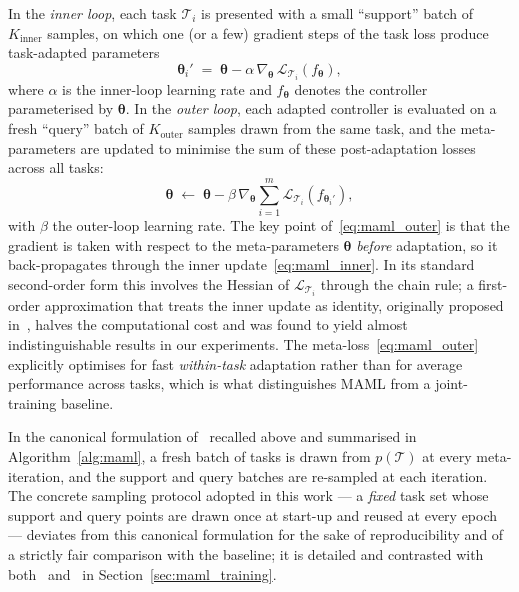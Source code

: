 \documentclass[11pt,a4paper]{article}
\theoremstyle{remark}
\numberwithin{equation}{section}
\begin{document}
In the \emph{inner loop}, each task $\mathcal{T}_i$ is presented with a small
``support'' batch of $K_{\mathrm{inner}}$ samples, on which one (or a few)
gradient steps of the task loss produce task-adapted parameters
\begin{equation}
\boldsymbol{\theta}_i' \;=\; \boldsymbol{\theta}
- \alpha \, \nabla_{\boldsymbol{\theta}}\,
  \mathcal{L}_{\mathcal{T}_i}\!\left(f_{\boldsymbol{\theta}}\right),
\label{eq:maml_inner}
\end{equation}
where $\alpha$ is the inner-loop learning rate and $f_{\boldsymbol{\theta}}$
denotes the controller parameterised by $\boldsymbol{\theta}$. In the
\emph{outer loop}, each adapted controller is evaluated on a fresh ``query''
batch of $K_{\mathrm{outer}}$ samples drawn from the same task, and the
meta-parameters are updated to minimise the sum of these post-adaptation losses
across all tasks:
\begin{equation}
\boldsymbol{\theta} \;\leftarrow\; \boldsymbol{\theta}
- \beta\, \nabla_{\boldsymbol{\theta}} \sum_{i=1}^{m}
  \mathcal{L}_{\mathcal{T}_i}\!\left(f_{\boldsymbol{\theta}_i'}\right),
\label{eq:maml_outer}
\end{equation}
with $\beta$ the outer-loop learning rate. The key point
of~\eqref{eq:maml_outer} is that the gradient is taken with respect to the
meta-parameters $\boldsymbol{\theta}$ \emph{before} adaptation, so it
back-propagates through the inner update~\eqref{eq:maml_inner}. In its standard
second-order form this involves the Hessian of $\mathcal{L}_{\mathcal{T}_i}$
through the chain rule; a first-order approximation that treats the inner
update as identity, originally proposed in~\cite{finn2017maml}, halves the
computational cost and was found to yield almost indistinguishable results in our
experiments. The meta-loss~\eqref{eq:maml_outer}
explicitly optimises for fast \emph{within-task} adaptation rather than for
average performance across tasks, which is what distinguishes MAML from a
joint-training baseline.

In the canonical formulation of~\cite{finn2017maml} recalled above and
summarised in Algorithm~\ref{alg:maml}, a fresh batch of tasks is drawn from
$p(\mathcal{T})$ at every meta-iteration, and the support and query batches are
re-sampled at each iteration. The concrete sampling protocol adopted in this
work --- a \emph{fixed} task set whose support and query points are drawn once
at start-up and reused at every epoch --- deviates from this canonical
formulation for the sake of reproducibility and of a strictly fair comparison
with the baseline; it is detailed and contrasted with both~\cite{finn2017maml}
and~\cite{goffin2026} in Section~\ref{sec:maml_training}.
\end{document}
